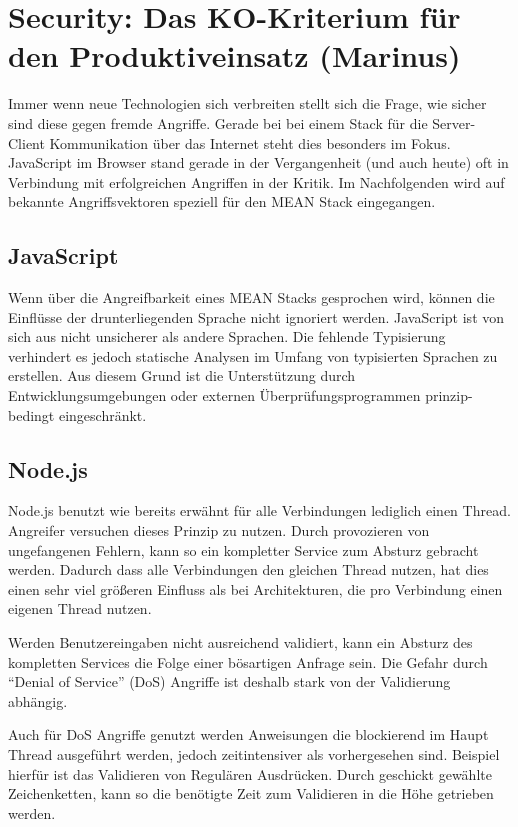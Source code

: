 \chapter{Security: Das KO-Kriterium für den Produktiveinsatz
(Marinus)}\label{security-das-ko-kriterium-fuxfcr-den-produktiveinsatz-marinus}

Immer wenn neue Technologien sich verbreiten stellt sich die Frage, wie
sicher sind diese gegen fremde Angriffe. Gerade bei bei einem Stack für
die Server-Client Kommunikation über das Internet steht dies besonders
im Fokus. JavaScript im Browser stand gerade in der Vergangenheit (und
auch heute) oft in Verbindung mit erfolgreichen Angriffen in der Kritik.
Im Nachfolgenden wird auf bekannte Angriffsvektoren speziell für den
MEAN Stack eingegangen.

\section{JavaScript}\label{javascript}

Wenn über die Angreifbarkeit eines MEAN Stacks gesprochen wird, können
die Einflüsse der drunterliegenden Sprache nicht ignoriert werden.
JavaScript ist von sich aus nicht unsicherer als andere Sprachen. Die
fehlende Typisierung verhindert es jedoch statische Analysen im Umfang
von typisierten Sprachen zu erstellen. Aus diesem Grund ist die
Unterstützung durch Entwicklungsumgebungen oder externen
Überprüfungsprogrammen prinzip-bedingt eingeschränkt.

\section{Node.js}\label{node.js}

Node.js benutzt wie bereits erwähnt für alle Verbindungen lediglich
einen Thread. Angreifer versuchen dieses Prinzip zu nutzen. Durch
provozieren von ungefangenen Fehlern, kann so ein kompletter Service zum
Absturz gebracht werden. Dadurch dass alle Verbindungen den gleichen
Thread nutzen, hat dies einen sehr viel größeren Einfluss als bei
Architekturen, die pro Verbindung einen eigenen Thread nutzen.

Werden Benutzereingaben nicht ausreichend validiert, kann ein Absturz
des kompletten Services die Folge einer bösartigen Anfrage sein. Die
Gefahr durch ``Denial of Service'' (DoS) Angriffe ist deshalb stark von
der Validierung abhängig.

Auch für DoS Angriffe genutzt werden Anweisungen die blockierend im
Haupt Thread ausgeführt werden, jedoch zeitintensiver als vorhergesehen
sind. Beispiel hierfür ist das Validieren von Regulären Ausdrücken.
Durch geschickt gewählte Zeichenketten, kann so die benötigte Zeit zum
Validieren in die Höhe getrieben werden.

